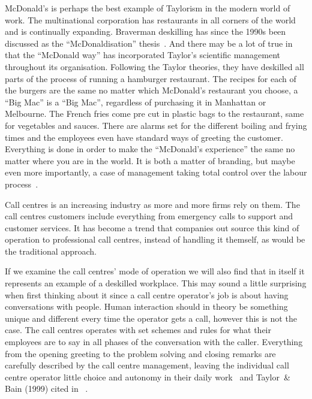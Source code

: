 \documentclass[a4paper,12pt,titlepage]{article}
\begin{document}
  McDonald's is perhaps the best example of Taylorism in the modern world of
  work. The multinational corporation has restaurants in all corners of the world
  and is continually expanding. Braverman deskilling has since the 1990s been
  discussed as the ``McDonaldisation'' thesis~\cite[433]{ahdb}. And there
  may be a lot of true in that the ``McDonald way'' has incorporated Taylor's 
  scientific management throughout its organisation. Following the Taylor
  theories, they have deskilled all parts of the process of running a
  hamburger restaurant. The recipes for each of the burgers are
  the same no matter which McDonald's restaurant you choose, a ``Big Mac'' is
  a ``Big Mac'', regardless of purchasing it in Manhattan or Melbourne.
  The French fries come pre cut in plastic bags to the restaurant, same
  for vegetables and sauces. There are alarms set for the different boiling
  and frying times and the employees even have standard ways of greeting
  the customer. Everything is done in order to make the ``McDonald's experience''
  the same no matter where you are in the world. It is both a matter of
  branding, but maybe even more importantly, a case of management taking
  total control over the labour process~\cite[143-144]{mnpb}.

  Call centres is an increasing industry as more and more firms rely on them.
  The call centres customers include everything from emergency calls
  to support and customer services. It has become a trend that companies
  out source this kind of operation to professional call centres, instead
  of handling it themself, as would be the traditional approach.

  If we examine the call centres' mode of operation we will also
  find that in itself it represents an example of a deskilled workplace.
  This may sound a little surprising when first thinking about it since
  a call centre operator's job is about having conversations with people.
  Human interaction should in theory be something unique and different
  every time the operator gets a call, however this is not the case. The
  call centres operates with set schemes and rules for what their
  employees are to say in all phases of the conversation with the
  caller. Everything from the opening greeting to the problem solving
  and closing remarks are carefully described by the call centre management,
  leaving the individual call centre operator little choice and autonomy
  in their daily work~\cite[58]{ptcs} and Taylor~\& Bain (1999) cited
  in ~\cite[436]{ahdb}.
\end{document}
